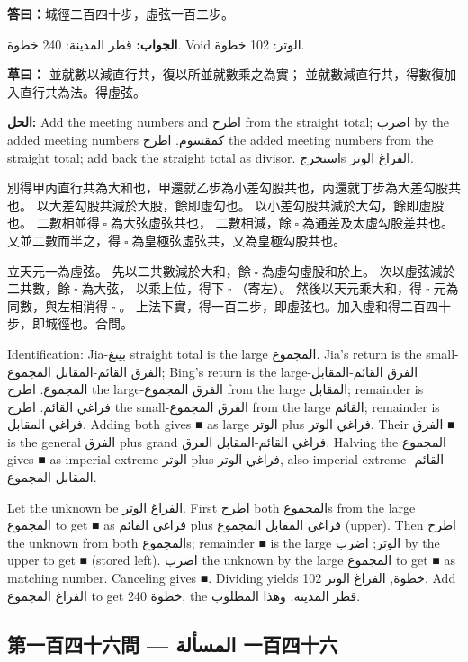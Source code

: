 \documentclass[11pt,a4paper]{article}
\newcommand{\ar}[1]{\arabicfont\beginR #1\endR}
\newcommand{\ChinCol}[1]{\begin{minipage}[t]{0.48\textwidth}#1\end{minipage}}
\newcommand{\ArabCol}[1]{\begin{minipage}[t]{0.48\textwidth}\arabicfont\beginR #1\endR\end{minipage}}
\newcommand{\parallelsection}[2]{%
  \noindent\ChinCol{#1}\hfill\ArabCol{#2}\par\vspace{0.5cm}%
}
\newcommand{\answer}[2]{\par\noindent%
  \begin{minipage}[t]{0.48\textwidth}\textbf{答曰：}#1\end{minipage}%
  \hfill%
  \begin{minipage}[t]{0.48\textwidth}\arabicfont\beginR\textbf{الجواب:} #2\endR\end{minipage}\par\vspace{0.2cm}}
\newcommand{\working}[2]{\par\noindent%
  \begin{minipage}[t]{0.48\textwidth}\textbf{草曰：}#1\end{minipage}%
  \hfill%
  \begin{minipage}[t]{0.48\textwidth}\arabicfont\beginR\textbf{الحل:} #2\endR\end{minipage}\par\vspace{0.2cm}}
\begin{document}
\answer{城徑二百四十步，虛弦一百二步。}{قطر المدينة: 240 خطوة. Void الوتر: 102 خطوة.}

\working{%
並就數以減直行共，復以所並就數乘之為實；
並就數減直行共，得數復加入直行共為法。得虛弦。}{%
Add the meeting numbers and اطرح from the straight total; اضرب by the added meeting numbers كمقسوم. اطرح the added meeting numbers from the straight total; add back the straight total as divisor. استخرجs الفراغ الوتر.}

\parallelsection{%
別得甲丙直行共為大和也，甲還就乙步為小差勾股共也，丙還就丁步為大差勾股共也。
以大差勾股共減於大股，餘即虛勾也。
以小差勾股共減於大勾，餘即虛股也。
二數相並得$ \; \square \; $為大弦虛弦共也，
二數相減，餘$ \; \square \; $為通差及太虛勾股差共也。
又並二數而半之，得$ \; \square \; $為皇極弦虛弦共，又為皇極勾股共也。

立天元一為虛弦。
先以二共數減於大和，餘$ \; \square \; $為虛勾虛股和於上。
次以虛弦減於二共數，餘$ \; \square \; $為大弦，
以乘上位，得下$ \; \square \; $（寄左）。
然後以天元乘大和，得$ \; \square \; $元為同數，與左相消得$ \; \square \; $。
上法下實，得一百二步，即虛弦也。加入虛和得二百四十步，即城徑也。合問。}{%
Identification: Jia-بينغ straight total is the large المجموع. Jia's return is the small-الفرق القائم-المقابل المجموع; Bing's return is the large-الفرق القائم-المقابل المجموع. اطرح the large-الفرق المجموع from the large المقابل; remainder is فراغي القائم. اطرح the small-الفرق المجموع from the large القائم; remainder is فراغي المقابل. Adding both gives ■ as large الوتر plus فراغي الوتر. Their الفرق ■ is the general الفرق plus grand فراغي القائم-المقابل الفرق. Halving the المجموع gives ■ as imperial extreme الوتر plus فراغي الوتر, also imperial extreme القائم-المقابل المجموع.

Let the unknown be الفراغ الوتر. First اطرح both المجموعs from the large المجموع to get ■ as فراغي القائم plus فراغي المقابل المجموع (upper). Then اطرح the unknown from both المجموعs; remainder ■ is the large الوتر; اضرب by the upper to get ■ (stored left). اضرب the unknown by the large المجموع to get ■ as matching number. Canceling gives ■. Dividing yields 102 خطوة, الفراغ الوتر. Add الفراغ المجموع to get 240 خطوة, the قطر المدينة. وهذا المطلوب.}

\vspace{0.5cm}

\subsection*{第一百四十六問 --- \ar{المسألة 一百四十六}}
\end{document}
